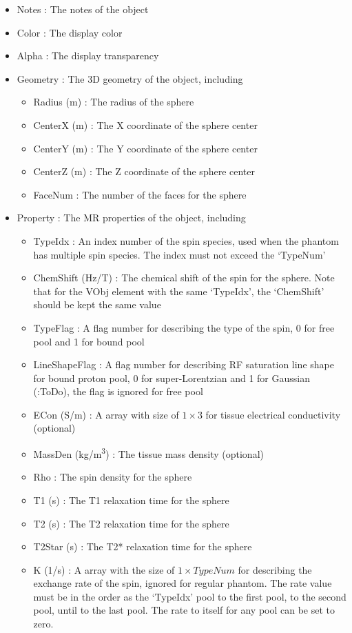 \documentclass{book}%
\begin{document}
\begin{itemize}
	\item Notes : The notes of the object
	\item Color : The display color
	\item Alpha : The display transparency
	\item Geometry : The 3D geometry of the object, including
	\begin{itemize}
		\item Radius (m) : The radius of the sphere
		\item CenterX (m) : The X coordinate of the sphere center
		\item CenterY (m) : The Y coordinate of the sphere center
		\item CenterZ (m) : The Z coordinate of the sphere center
		\item FaceNum : The number of the faces for the sphere
	\end{itemize}
	\item Property : The MR properties of the object, including
	\begin{itemize}
		\item TypeIdx : An index number of the spin species, used when the phantom has multiple spin species. The index must not exceed the `TypeNum'
		\item ChemShift (Hz/T) : The chemical shift of the spin for the sphere. Note that for the VObj element with the same `TypeIdx', the `ChemShift' should be kept the same value
		\item TypeFlag : A flag number for describing the type of the spin, 0 for free pool and 1 for bound pool
		\item LineShapeFlag : A flag number for describing RF saturation line shape for bound proton pool, 0 for super-Lorentzian and 1 for Gaussian (:ToDo), the flag is ignored for free pool
		\item ECon (S/m) : A array with size of $1 \times 3 $ for tissue electrical conductivity (optional)
		\item MassDen (kg/m\textsuperscript{3}) : The tissue mass density (optional)
		\item Rho : The spin density for the sphere
		\item T1 (s) : The T1 relaxation time for the sphere
		\item T2 (s) : The T2 relaxation time for the sphere
		\item T2Star (s) : The T2* relaxation time for the sphere
		\item K (1/s) : A array with the size of $1 \times TypeNum$ for describing the exchange rate of the spin, ignored for regular phantom. The rate value must be in the order as the `TypeIdx' pool to the first pool, to the second pool, until to the last pool. The rate to itself for any pool can be set to zero.
	\end{itemize}
\end{itemize}
\end{document}
